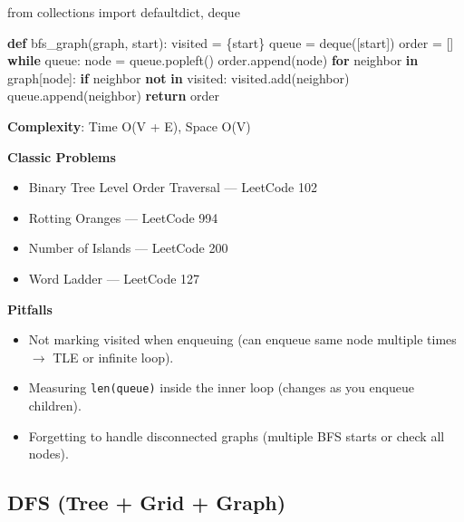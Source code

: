 \documentclass[11pt]{article}
\providecommand{\tightlist}{\setlength{\itemsep}{1pt}\setlength{\parskip}{0pt}}
\newenvironment{Shaded}{\begin{snugshade}}{\end{snugshade}}
\newcommand{\ControlFlowTok}[1]{\textcolor[rgb]{0.99,0.74,0.29}{\textbf{#1}}}
\newcommand{\ImportTok}[1]{\textcolor[rgb]{0.15,0.68,0.38}{#1}}
\newcommand{\KeywordTok}[1]{\textcolor[rgb]{0.81,0.81,0.76}{\textbf{#1}}}
\newcommand{\NormalTok}[1]{\textcolor[rgb]{0.81,0.81,0.76}{#1}}
\newcommand{\OperatorTok}[1]{\textcolor[rgb]{0.81,0.81,0.76}{#1}}
\begin{document}
\begin{Shaded}
\begin{Highlighting}[]
\ImportTok{from}\NormalTok{ collections }\ImportTok{import}\NormalTok{ defaultdict, deque}

\KeywordTok{def}\NormalTok{ bfs\_graph(graph, start):}
\NormalTok{    visited }\OperatorTok{=}\NormalTok{ \{start\}}
\NormalTok{    queue }\OperatorTok{=}\NormalTok{ deque([start])}
\NormalTok{    order }\OperatorTok{=}\NormalTok{ []}
    \ControlFlowTok{while}\NormalTok{ queue:}
\NormalTok{        node }\OperatorTok{=}\NormalTok{ queue.popleft()}
\NormalTok{        order.append(node)}
        \ControlFlowTok{for}\NormalTok{ neighbor }\KeywordTok{in}\NormalTok{ graph[node]:}
            \ControlFlowTok{if}\NormalTok{ neighbor }\KeywordTok{not} \KeywordTok{in}\NormalTok{ visited:}
\NormalTok{                visited.add(neighbor)}
\NormalTok{                queue.append(neighbor)}
    \ControlFlowTok{return}\NormalTok{ order}
\end{Highlighting}
\end{Shaded}

\textbf{Complexity}: Time O(V + E), Space O(V)

\textbf{Classic Problems}

\begin{itemize}
\tightlist
\item
  Binary Tree Level Order Traversal --- LeetCode 102
\item
  Rotting Oranges --- LeetCode 994
\item
  Number of Islands --- LeetCode 200
\item
  Word Ladder --- LeetCode 127
\end{itemize}

\textbf{Pitfalls}

\begin{itemize}
\tightlist
\item
  Not marking visited when enqueuing (can enqueue same node multiple times \(\rightarrow\) TLE or infinite loop).
\item
  Measuring \texttt{len(queue)} inside the inner loop (changes as you enqueue children).
\item
  Forgetting to handle disconnected graphs (multiple BFS starts or check all nodes).
\end{itemize}

\subsection{DFS (Tree + Grid + Graph)}\label{dfs-tree--grid--graph}
\end{document}
